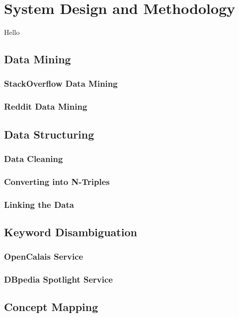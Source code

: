 

\chapter{System Design and Methodology} \label{Chapter:System Design and Methodology}
Hello

\section{Data Mining}
\subsection{StackOverflow Data Mining}
\subsection{Reddit Data Mining}

\section{Data Structuring}
\subsection{Data Cleaning}
\subsection{Converting into N-Triples}
\subsection{Linking the Data}

\section{Keyword Disambiguation}
\subsection{OpenCalais Service}
\subsection{DBpedia Spotlight Service}

\section{Concept Mapping}
